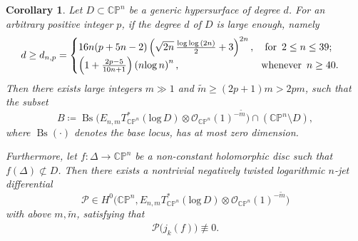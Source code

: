 \documentclass[english, 12pt]{amsart}
\DeclareMathOperator{\bs}{Bs}
\def\log{\mathrm{log}\,}
\theoremstyle{plain}
\newtheorem{cor}[thm]{{Corollary}}
\theoremstyle{remark}
\numberwithin{equation}{section}
\theoremstyle{plain}
\theoremstyle{named}
\begin{document}
\begin{cor}
	\label{cor of ramification gauss maps}
	Let $D\subset\mathbb{C}\mathbb{P}^n$ be a generic hypersurface of degree $d$. For an arbitrary positive integer $p$, if the degree $d$ of $D$ is large enough, namely
	\begin{equation}\label{eq:degree bound d }
		d\geq d_{n,p}=
		\begin{cases}
			16n(p + 5n -2)\left(\sqrt{2n}\, \frac{\log\log(2n)}{2}+3\right)^{2n},\quad \text{for }\,2\leq n\leq 39;\\
			\left(1+\frac{2p-5}{10n+1}\right)\left(n\log n\right)^n,\qquad\qquad\qquad\qquad\, \text{whenever\, $n\geq 40$}.
		\end{cases}
	\end{equation}
	Then there exists large integers $m\gg1$ and $\tilde{m}\geq(2p+1)m>2pm$, such that the subset
	\[ B\coloneq
	\bs	\big(
	E_{n,m}T_{\mathbb{C}\mathbb{P}^n}^*(\log D)
	\otimes
	\mathcal{O}_{\mathbb{C}\mathbb{P}^n}(1)^{-\widetilde{m}}
	\big)\cap \left(\mathbb{C}\mathbb{P}^n\setminus D\right),
	\]
	where \( \bs(\cdot) \) denotes the base locus,
	has at most zero dimension. 
	
	Furthermore, let $f\colon\Delta\rightarrow \mathbb{C}\mathbb{P}^n$ be a non-constant holomorphic disc such that $f(\Delta)\not\subset D$. Then there exists a nontrivial negatively twisted logarithmic $n$-jet differential
	\[
	\mathscr{P}\in H^0\big(
	\mathbb{C}\mathbb{P}^n,E_{n,m}T_{\mathbb{C}\mathbb{P}^n}^*(\log D)\otimes\mathcal{O}_{\mathbb{C}\mathbb{P}^n}(1)^{-\widetilde{m}}\big)
	\]
	with above $m,\widetilde{m}$, satisfying that
	\begin{align*}
		\mathscr{P}\big(j_k(f)\big)\not\equiv0.
	\end{align*}
\end{cor}
\end{document}
